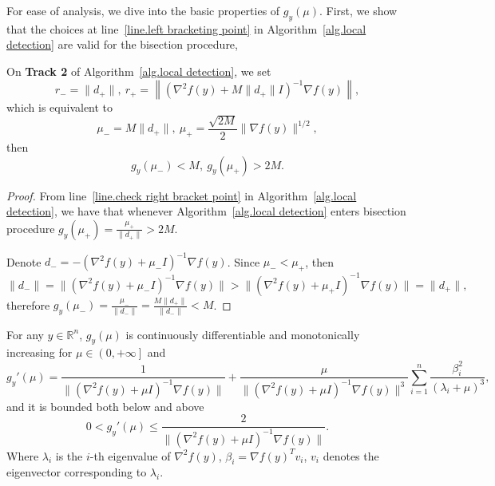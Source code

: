 \documentclass{mcom-l}
\numberwithin{equation}{section}
\begin{document}
For ease of analysis, we dive into the basic properties of $g_y(\mu)$. First, we show that the choices at line~\ref{line.left bracketing point} in Algorithm~\ref{alg.local detection} are valid for the bisection procedure,
\begin{lemma}
    \label{eq.valid bracketing}
    On \textbf{Track 2} of Algorithm~\ref{alg.local detection}, we set
    \begin{equation*}
        r_- = \|d_+\|, \ r_+ = \left \|\left(\nabla^2f(y)+M\|d_+\| I\right)^{-1}\nabla f(y)\right\|,
    \end{equation*}
    which is equivalent to
    \begin{equation*}
        \mu_- = M\|d_+\|,\ \mu_+=\frac{\sqrt{2M}}{2}\|\nabla f(y)\|^{1/2},
    \end{equation*}
    then
    \begin{equation*}
        g_y(\mu_-) < M, \ g_y(\mu_+) >2M.
    \end{equation*}
\end{lemma}
\begin{proof}
    From line~\ref{line.check right bracket point} in Algorithm~\ref{alg.local detection}, we have that whenever Algorithm~\ref{alg.local detection} enters bisection procedure $g_y(\mu_+)=\frac{\mu_+}{\|d_+\|} >2M$.

    Denote $d_- = -\left(\nabla^2 f(y)+\mu_-I\right)^{-1}\nabla f(y)$. Since $\mu_- <\mu_+$, then
    \begin{equation*}
        \|d_-\|=\| \left (\nabla ^2 f(y)+\mu_- I\right )^{-1} \nabla f(y)\|>\| \left (\nabla ^2 f(y)+\mu_+ I\right )^{-1} \nabla f(y)\| = \|d_+\|,
    \end{equation*}
    therefore $g_y(\mu_-) = \frac{\mu_-}{\|d_-\|}=\frac{M\|d_+\|}{\|d_-\|}< M$.
\end{proof}
\begin{lemma}
    \label{lem.property g}
    For any $y\in \mathbb{R}^n$, $g_y(\mu)$ is continuously differentiable and monotonically increasing for $\mu \in \left (0,+\infty\right ]$ and
    \begin{equation}
        \label{eq.derivative}
        g_y'(\mu) = \frac{1}{\|\left (\nabla ^2 f(y)+\mu I \right)^{-1}\nabla f(y)\|}+\frac{\mu}{\|\left (\nabla ^2 f(y)+\mu I \right)^{-1}\nabla f(y)\|^3}\sum_{i=1}^n\frac{\beta_i^2}{\left (\lambda_i+\mu\right )^3},
    \end{equation}
    and it is bounded both below and above
    \begin{equation}
        \label{eq.derivative bound}
        0< g_y'(\mu) \leq \frac{2}{\|\left (\nabla ^2 f(y)+\mu I \right)^{-1}\nabla f(y)\|}.
    \end{equation}
    Where $\lambda_i$ is the $i$-th eigenvalue of $\nabla ^2 f(y)$, $\beta_i = \nabla f(y)^T v_i$, $v_i$ denotes the eigenvector corresponding to $\lambda_i$.
\end{lemma}
\end{document}
